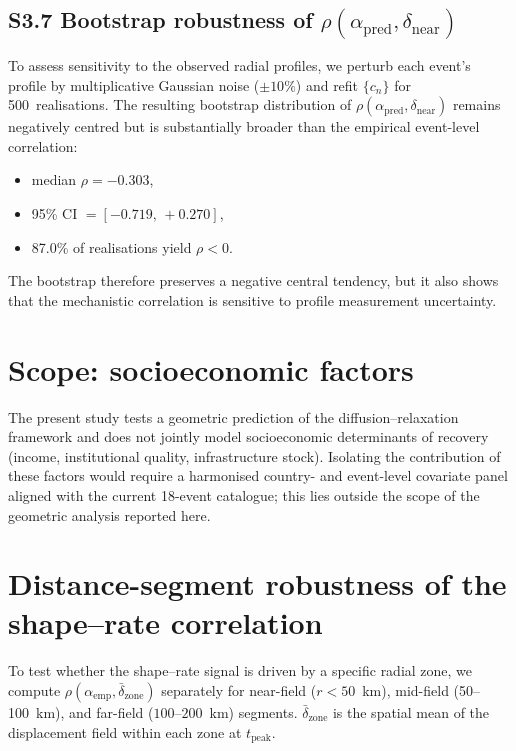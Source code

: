 \documentclass[11pt]{article}
\newcommand{\dnear}{\delta_{\mathrm{near}}}
\newcommand{\apred}{\alpha_{\mathrm{pred}}}
\newcommand{\aemp}{\alpha_{\mathrm{emp}}}
\begin{document}
\subsection*{S3.7 Bootstrap robustness of $\rho(\apred, \dnear)$}

To assess sensitivity to the observed radial profiles, we perturb
each event's profile by multiplicative Gaussian noise ($\pm 10\%$)
and refit $\{c_n\}$ for 500~realisations.  The resulting bootstrap
distribution of $\rho(\apred,\dnear)$ remains negatively centred but
is substantially broader than the empirical event-level correlation:
\begin{itemize}
  \item median $\rho = -0.303$,
  \item 95\% CI $= [-0.719,\,+0.270]$,
  \item 87.0\% of realisations yield $\rho < 0$.
\end{itemize}
The bootstrap therefore preserves a negative central tendency, but it
also shows that the mechanistic correlation is sensitive to profile
measurement uncertainty.


\section{Scope: socioeconomic factors}
\label{sec:si_socio}

The present study tests a geometric prediction of the diffusion--relaxation
framework and does not jointly model socioeconomic determinants of
recovery (income, institutional quality, infrastructure stock).
Isolating the contribution of these factors would require a harmonised
country- and event-level covariate panel aligned with the current
18-event catalogue; this lies outside the scope of the geometric
analysis reported here.


\section{Distance-segment robustness of the shape--rate correlation}
\label{sec:si_distance}

To test whether the shape--rate signal is driven by a specific radial
zone, we compute $\rho(\aemp,\bar\delta_{\mathrm{zone}})$ separately
for near-field ($r < 50$~km), mid-field (50--100~km), and far-field
($100$--$200$~km) segments.  $\bar\delta_{\mathrm{zone}}$ is the
spatial mean of the displacement field within each zone at
$t_{\mathrm{peak}}$.
\end{document}
